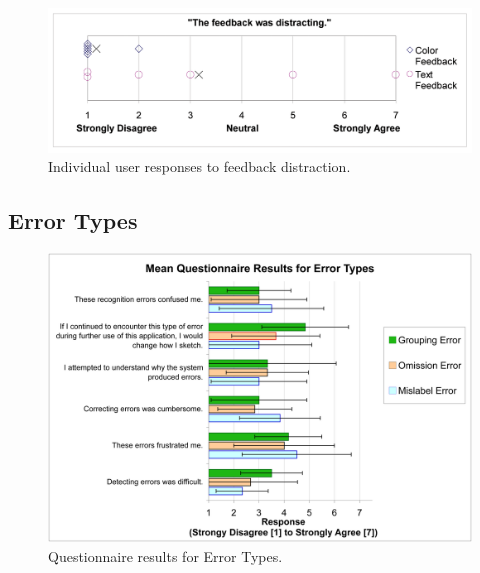 \documentclass{elsart}
\begin{document}

\begin{figure}[tb]
  \centering
  \includegraphics[width=1.0\linewidth]{feedbackDistracting.png}
  \caption{\label{fig:feedbackDistracting}
           Individual user responses to feedback distraction.}
\end{figure}


\subsection{Error Types}

\begin{figure}[tb]
  \centering
  \includegraphics[width=.9\linewidth]{QuestionnaireResultsError.png}
  \caption{\label{fig:qResultsErrors}
           Questionnaire results for Error Types. }
\end{figure}
\end{document}
